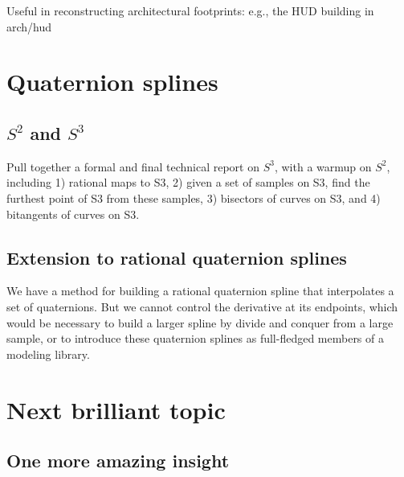 \documentclass[11pt]{article}
\begin{document}
Useful in reconstructing architectural footprints: e.g., the HUD building in arch/hud



\section{Quaternion splines}

\subsection{$S^2$ and $S^3$}

Pull together a formal and final technical report on $S^3$, with a warmup on $S^2$, including 
1) rational maps to S3, 
2) given a set of samples on S3, find the furthest point of S3 from these samples,
3) bisectors of curves on S3, and
4) bitangents of curves on S3.


\subsection{Extension to rational quaternion splines}

We have a method for building a rational quaternion spline that interpolates
a set of quaternions.
But we cannot control the derivative at its endpoints, which would be necessary
to build a larger spline by divide and conquer from a large sample,
or to introduce these quaternion splines as full-fledged members of a modeling library.



\section{Next brilliant topic}


\subsection{One more amazing insight}

\end{document}
